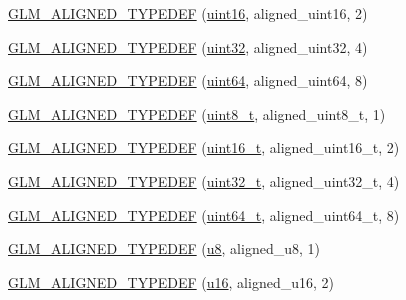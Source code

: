 \begin{DoxyCompactItemize}
\item 
\hyperlink{group__gtx__type__aligned_ga06c296c9e398b294c8c9dd2a7693dcbb}{G\+L\+M\+\_\+\+A\+L\+I\+G\+N\+E\+D\+\_\+\+T\+Y\+P\+E\+D\+E\+F} (\hyperlink{group__gtc__type__precision_gad8c2939e1fdd8e5828b31d95c52255d5}{uint16}, aligned\+\_\+uint16, 2)
\item 
\hyperlink{group__gtx__type__aligned_gacf1744488c96ebd33c9f36ad33b2010a}{G\+L\+M\+\_\+\+A\+L\+I\+G\+N\+E\+D\+\_\+\+T\+Y\+P\+E\+D\+E\+F} (\hyperlink{group__gtc__type__precision_ga202b6a53c105fcb7e531f9b443518451}{uint32}, aligned\+\_\+uint32, 4)
\item 
\hyperlink{group__gtx__type__aligned_ga3328061a64c20ba59d5f9da24c2cd059}{G\+L\+M\+\_\+\+A\+L\+I\+G\+N\+E\+D\+\_\+\+T\+Y\+P\+E\+D\+E\+F} (\hyperlink{group__gtc__type__precision_gae3632bf9b37da66233d78930dd06378a}{uint64}, aligned\+\_\+uint64, 8)
\item 
\hyperlink{group__gtx__type__aligned_gaf6ced36f13bae57f377bafa6f5fcc299}{G\+L\+M\+\_\+\+A\+L\+I\+G\+N\+E\+D\+\_\+\+T\+Y\+P\+E\+D\+E\+F} (\hyperlink{group__gtc__type__precision_ga93adf6dd9803408f3e3aaf9dedda352b}{uint8\+\_\+t}, aligned\+\_\+uint8\+\_\+t, 1)
\item 
\hyperlink{group__gtx__type__aligned_gafbc7fb7847bfc78a339d1d371c915c73}{G\+L\+M\+\_\+\+A\+L\+I\+G\+N\+E\+D\+\_\+\+T\+Y\+P\+E\+D\+E\+F} (\hyperlink{group__gtc__type__precision_gac4eb4f43cae8129b00086dc234d3b8fc}{uint16\+\_\+t}, aligned\+\_\+uint16\+\_\+t, 2)
\item 
\hyperlink{group__gtx__type__aligned_gaa86bc56a73fd8120b1121b5f5e6245ae}{G\+L\+M\+\_\+\+A\+L\+I\+G\+N\+E\+D\+\_\+\+T\+Y\+P\+E\+D\+E\+F} (\hyperlink{group__gtc__type__precision_ga822ca53a9ad412504532838906276a99}{uint32\+\_\+t}, aligned\+\_\+uint32\+\_\+t, 4)
\item 
\hyperlink{group__gtx__type__aligned_ga68c0b9e669060d0eb5ab8c3ddeb483d8}{G\+L\+M\+\_\+\+A\+L\+I\+G\+N\+E\+D\+\_\+\+T\+Y\+P\+E\+D\+E\+F} (\hyperlink{group__gtc__type__precision_ga058f57c19e1befdcf12498944bd73e69}{uint64\+\_\+t}, aligned\+\_\+uint64\+\_\+t, 8)
\item 
\hyperlink{group__gtx__type__aligned_ga4f3bab577daf3343e99cc005134bce86}{G\+L\+M\+\_\+\+A\+L\+I\+G\+N\+E\+D\+\_\+\+T\+Y\+P\+E\+D\+E\+F} (\hyperlink{group__gtc__type__precision_ga5e3dc67373d5068997d2d9f41c9024d2}{u8}, aligned\+\_\+u8, 1)
\item 
\hyperlink{group__gtx__type__aligned_ga13a2391339d0790d43b76d00a7611c4f}{G\+L\+M\+\_\+\+A\+L\+I\+G\+N\+E\+D\+\_\+\+T\+Y\+P\+E\+D\+E\+F} (\hyperlink{group__gtc__type__precision_gae7a1571503f83d2264ddfa705a6b082a}{u16}, aligned\+\_\+u16, 2)

\end{DoxyCompactItemize}
